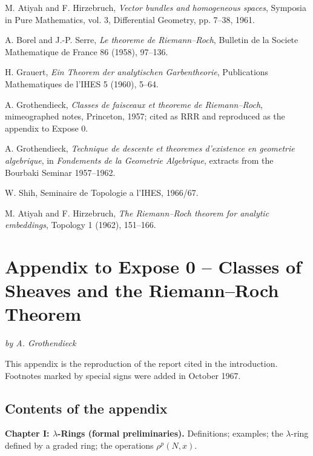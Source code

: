 \documentclass[14pt]{extarticle}
\begin{document}
\begin{enumerate}[label={\,[\arabic*]\,},leftmargin=*]
\item M. Atiyah and F. Hirzebruch, \emph{Vector bundles and homogeneous spaces}, Symposia in Pure Mathematics, vol. 3, Differential Geometry, pp. 7--38, 1961.
\item A. Borel and J.-P. Serre, \emph{Le theoreme de Riemann--Roch}, Bulletin de la Societe Mathematique de France 86 (1958), 97--136.
\item H. Grauert, \emph{Ein Theorem der analytischen Garbentheorie}, Publications Mathematiques de l'IHES 5 (1960), 5--64.
\item A. Grothendieck, \emph{Classes de faisceaux et theoreme de Riemann--Roch}, mimeographed notes, Princeton, 1957; cited as RRR and reproduced as the appendix to Expose 0.
\item A. Grothendieck, \emph{Technique de descente et theoremes d'existence en geometrie algebrique}, in \emph{Fondements de la Geometrie Algebrique}, extracts from the Bourbaki Seminar 1957--1962.
\item W. Shih, Seminaire de Topologie a l'IHES, 1966/67.
\item M. Atiyah and F. Hirzebruch, \emph{The Riemann--Roch theorem for analytic embeddings}, Topology 1 (1962), 151--166.
\end{enumerate}

\newpage

\section{Appendix to Expose 0 -- Classes of Sheaves and the Riemann--Roch Theorem}

\begin{center}
\emph{by A. Grothendieck}
\end{center}

This appendix is the reproduction of the report cited in the introduction. Footnotes marked by special signs were added in October 1967.

\subsection*{Contents of the appendix}

\textbf{Chapter I: $\lambda$-Rings (formal preliminaries).} Definitions; examples; the $\lambda$-ring defined by a graded ring; the operations $\rho^p(N,x)$.
\end{document}
